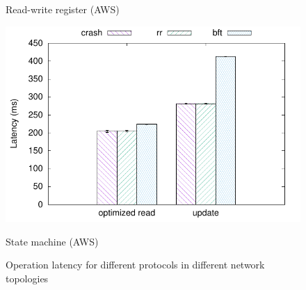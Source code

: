 \begin{figure}[th!]
\begin{minipage}[t]{0.24\linewidth}
        \caption{Read-write register (AWS)}\label{fig:aws_reg_lat}
    \end{minipage}
    \begin{minipage}[t]{0.24\linewidth}
        \centering
        \includegraphics[width=\linewidth]{teem_results/protocol/aws/aws_smr}
        \caption{State machine (AWS)}\label{fig:aws_smr_lat}
    \end{minipage}
    \caption{Operation latency for different protocols in
    different network topologies}
\end{figure}\label{fig:protocol_lat}

